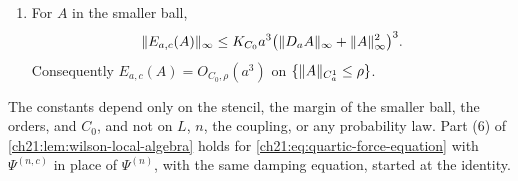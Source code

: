 \begin{lemma}
\begin{enumerate}
\[
 \begin{split}
 \norm{D_a(E_{a,c}(A)-E_{a,c}(B))}_\infty\le K_{C_0}\bigl\{&M^2\norm{D_a(A-B)}_\infty\\
 &+M(\norm{D_aA}_\infty+\norm{D_aB}_\infty)\norm{A-B}_\infty\bigr\}.
 \end{split}
\]
\item For $A$ in the smaller ball,
\begin{equation}\label{ch21:eq:quartic-curvature-gain}
 \lVert E_{a,c}(A)\rVert_\infty\le K_{C_0}a^3\bigl(\lVert D_aA\rVert_\infty+\lVert A\rVert_\infty^2\bigr)^3 .
\end{equation}
Consequently $E_{a,c}(A)=O_{C_0,\rho}(a^3)$ on $\{\lVert A\rVert_{C_a^1}\le\rho\}$.
\end{enumerate}
The constants depend only on the stencil, the margin of the smaller ball, the orders, and $C_0$, and not on $L$, $n$, the coupling, or any probability law. Part (6) of \cref{ch21:lem:wilson-local-algebra} holds for \eqref{ch21:eq:quartic-force-equation} with $\Psi^{(n,c)}$ in place of $\Psi^{(n)}$, with the same damping equation, started at the identity.
\end{lemma}

